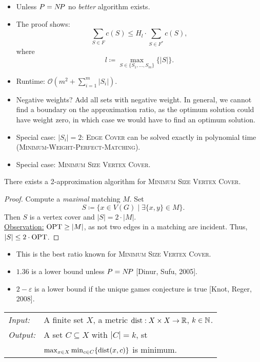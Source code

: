 \documentclass[../skript.tex]{subfiles}
\begin{document}
\begin{remark}
\begin{itemize}
\item Unless $P = N \! P$ no \textit{better} algorithm exists.
\item The proof shows:
\[
	\sum_{S \in F} c(S) \leq H_l \cdot \sum_{S \in F^*} c(S),
\]
where
\[
	l \coloneqq \max_{S \in \{S_1, \ldots, S_m\}} \{ |S| \}.
\]
\item Runtime: $\mathcal{O}(m^2 + \sum_{i=1}^m |S_i|)$.
\item Negative weights? Add all sets with negative weight. In general, we cannot find a boundary on the approximation ratio, as the optimum solution could have weight zero, in which case we would have to find an optimum solution.
\item Special case: $|S_i| = 2$: \textsc{Edge Cover} can be solved exactly in polynomial time (\textsc{Minimum-Weight-Perfect-Matching}).
\item Special case: \textsc{Minimum Size Vertex Cover}.
\end{itemize}
\end{remark}
\begin{theorem} %
There exists a 2-approximation algorithm for \textsc{Minimum Size Vertex Cover}.
\end{theorem}
\begin{proof}
Compute a \textit{maximal} matching $M$. Set
\[
	S \coloneqq \{ x \in V(G) \mid \exists \{ x, y\} \in M\}.
\]
Then $S$ is a vertex cover and $|S| = 2 \cdot |M|$. \\
\underline{Observation:} $\operatorname{OPT} \geq |M|$, as not two edges in a matching are incident.
Thus, $|S| \leq 2 \cdot \operatorname{OPT}$.
\end{proof}
\begin{remark}
\begin{itemize}
\item This is the best ratio known for \textsc{Minimum Size Vertex Cover}.
\item $1.36$ is a lower bound unless $P = N \! P$ [Dinur, Sufu, 2005].
\item $2-\varepsilon$ is a lower bound if the unique games conjecture is true [Knot, Reger, 2008].
\end{itemize}
\end{remark}
\begin{problem}[$k$-Center]
\begin{tabular}{@{}ll}
\textit{Input:} & A finite set $X$, a metric $\operatorname*{dist} : X \times X \to \mathbb{R}$, $k \in \mathbb{N}$. \\
\textit{Output:} & A set $C \subseteq X$ with $|C| = k$, \ac{st} \\
&$\max_{x \in X} \min_{c \in C} \{\operatorname*{dist}(x, c)\}$ is minimum.
\end{tabular}
\end{problem}
\end{document}
